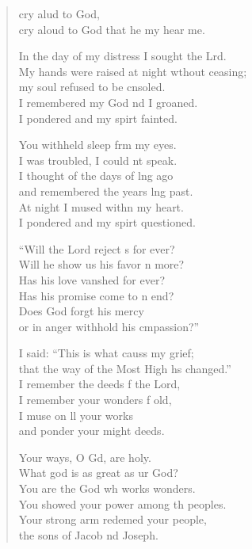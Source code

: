 \begin{verse}
  \begin{patverse}
     cry alud to God,\Med\\
cry aloud to God that he my hear me.

In the day of my distress I sought the Lrd.\Flex\\
My hands were raised at night w\pointup{\i}thout ceasing;\Med\\
my soul refused to be cnsoled.\\
I remembered my God nd I groaned.\Med\\
I pondered and my spir\pointup{\i}t fainted.

You withheld sleep frm my eyes.\Med\\
I was troubled, I could nt speak.\\
I thought of the days of lng ago\Med\\
and remembered the years lng past.\\
At night I mused with\pointup{\i}n my heart.\Med\\
I pondered and my spir\pointup{\i}t questioned.

“Will the Lord reject s for ever?\Med\\
Will he show us his favor n more?\\
Has his love van\pointup{\i}shed for ever?\Med\\
Has his promise come to n end?\\
Does God forgt his mercy\Med\\
or in anger withhold his cmpassion?”

I said: “This is what causs my grief;\Med\\
that the way of the Most High hs changed.”\\
I remember the deeds f the Lord,\Med\\
I remember your wonders f old,\\
I muse on ll your works\Med\\
and ponder your might deeds.

Your ways, O Gd, are holy.\Med\\
What god is as great as ur God?\\
You are the God wh works wonders.\Med\\
You showed your power among th peoples.\\
Your strong arm redemed your people,\Med\\
the sons of Jacob nd Joseph.


\end{patverse}
\end{verse}
